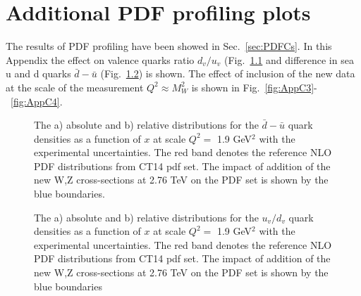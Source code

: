 \chapter{Additional PDF profiling plots}\label{app:PDF}

The results of PDF profiling have been showed in Sec.~\ref{sec:PDFCs}. In this Appendix the effect on valence quarks ratio $d_{v}/u_{v}$ (Fig.~\ref{fig:AppC1} and difference in sea u and d quarks $\bar{d}-\bar{u}$ (Fig.~\ref{fig:AppC2}) is shown. The effect of inclusion of the new data at the scale of the measurement $Q^2 \approx M^2_{W}$ is shown in Fig.~\ref{fig:AppC3}-~\ref{fig:AppC4}. 

\begin{figure}[!h]
\begin{minipage}[h]{0.49\linewidth}
\end{minipage}
\hfill
\begin{minipage}[h]{0.49\linewidth}
\end{minipage}
\caption{The a) absolute and  b) relative distributions for the $\bar{d}-\bar{u}$ quark densities as a function of $x$ at scale $Q^2=$ 1.9 GeV$^2$ with the experimental uncertainties. The red band denotes the reference NLO PDF distributions from CT14 pdf set. The impact of addition of the new W,Z cross-sections at 2.76 TeV on the PDF set is shown by the blue boundaries.}
\label{fig:AppC1}
\end{figure}

\begin{figure}[!h]
\begin{minipage}[h]{0.49\linewidth}
\end{minipage}
\hfill
\begin{minipage}[h]{0.49\linewidth}
\end{minipage}
\caption{The a) absolute and  b) relative distributions for the $u_v / d_v$ quark densities as a function of $x$ at scale $Q^2=$ 1.9 GeV$^2$ with the experimental uncertainties. The red band denotes the reference NLO PDF distributions from CT14 pdf set. The impact of addition of the new W,Z cross-sections at 2.76 TeV on the PDF set is shown by the blue boundaries}
\label{fig:AppC2}
\end{figure}

